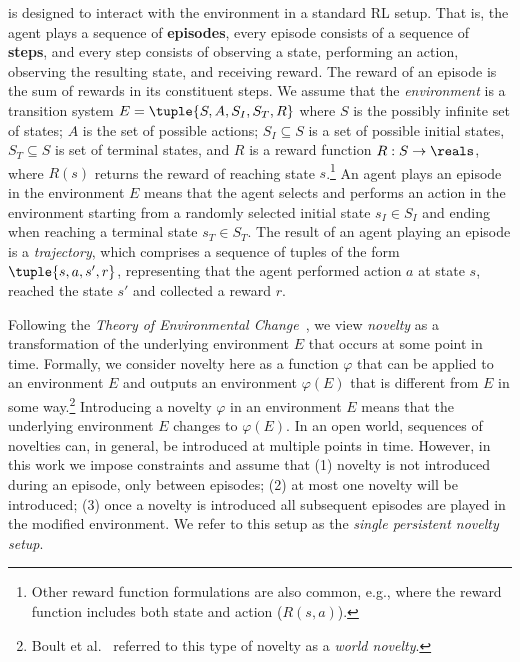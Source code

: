 \documentclass{article}
\begin{document}
\hydra is designed to interact with the environment in a standard RL setup. 
That is, the agent plays a sequence of \textbf{episodes}, 
every episode consists of a sequence of \textbf{steps},
and every step consists of observing a state, 
performing an action, 
observing the resulting state, 
and receiving reward. 
The reward of an episode is the sum of rewards in its constituent steps.
We assume that the \emph{environment} is a transition system $E=\tuple{S, A, S_I, S_T, R}$
where $S$ is the possibly infinite set of states;
$A$ is the set of possible actions; 
$S_I\subseteq S$ is a set of possible initial states, 
$S_T\subseteq S$ is set of terminal states, 
and $R$ is a reward function $R: S\rightarrow \reals$, where $R(s)$ returns the reward of reaching state $s$.\footnote{Other reward function formulations are also common, e.g., where the reward function includes both state and action ($R(s,a)$).}
An agent plays an episode in the environment $E$ 
means that the agent selects and performs an action in the environment starting 
from a randomly selected initial state $s_I\in S_I$ and ending when reaching a terminal state $s_T\in S_T$. 
The result of an agent playing an episode is a \emph{trajectory}, which comprises a sequence of tuples of the form $\tuple{s, a, s',r}$, representing that the agent performed action $a$ at state $s$, reached the state $s'$ and collected a reward $r$. 




Following the \emph{Theory of Environmental Change}~\cite{langley2020open}, 
we view \emph{novelty} as a transformation of the underlying environment $E$ that occurs at some point in time.
Formally, we consider novelty here as a function $\varphi$ that can be applied to an environment $E$ and outputs an environment $\varphi(E)$ 
that is different from $E$ in some way.\footnote{Boult et al.~\cite{boult2021towards} referred to this type of novelty as a \emph{world novelty}.}
Introducing a novelty $\varphi$ in an environment $E$ means that the underlying environment $E$ changes to $\varphi(E)$. 
In an open world, sequences of novelties can, in general, be introduced at multiple points in time. 
However, in this work we impose constraints and assume that 
(1) novelty is not introduced during an episode, only between episodes;
(2) at most one novelty will be introduced;
(3) once a novelty is introduced all subsequent episodes are played in the modified environment. 
We refer to this setup as the \emph{single persistent novelty setup}. 
\end{document}
